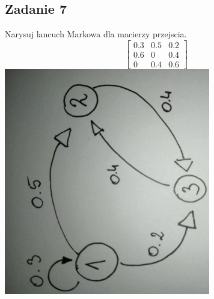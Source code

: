 \subsection{Zadanie 7}
Narysuj lancuch Markowa dla macierzy przejscia.
$$
\left[
\begin{array}{ccc}
0.3 & 0.5 & 0.2 \\
0.6 & 0 & 0.4 \\
0 & 0.4 & 0.6 
\end{array}
\right]
$$
\centering
\includegraphics[width=90mm, angle =270]{markow.jpg}